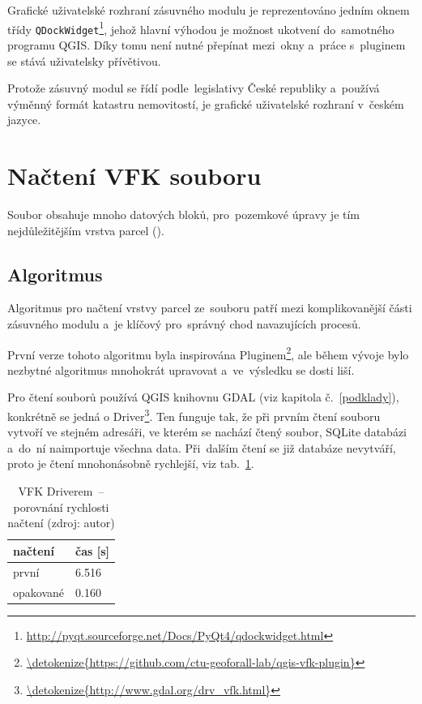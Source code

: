Grafické uživatelské rozhraní zásuvného modulu je reprezentováno
jedním oknem třídy
\texttt{QDockWidget}\footnote{\url{http://pyqt.sourceforge.net/Docs/PyQt4/qdockwidget.html}},
jehož hlavní výhodou je možnost ukotvení do~samotného programu
QGIS. Díky tomu není nutné přepínat mezi~okny a~práce s~pluginem se
stává uživatelsky přívětivou.

Protože zásuvný modul se řídí podle~legislativy České republiky
a~používá výmě\-nný formát katastru nemovitostí, je grafické
uživatelské rozhraní v~českém jazyce.

\section{Načtení VFK souboru}
\label{nacteni_vfk}

Soubor  obsahuje mnoho datových bloků, pro~pozemkové úpravy je
tím nej\-důležitějším vrstva parcel (\texttt{}).

\subsection{Algoritmus}
\label{nacteni_vfk_algoritmus}

Algoritmus pro načtení vrstvy parcel ze~souboru  patří mezi
komplikovanější části zásuvného modulu a~je klíčový pro~správný chod
navazujících procesů.

První verze tohoto algoritmu byla inspirována 
Pluginem\footnote{\url{\detokenize{https://github.com/ctu-geoforall-lab/qgis-vfk-plugin}}},
ale během vývoje bylo nezbytné algoritmus mnohokrát upravovat
a~ve~výsledku se dosti liší.

Pro čtení  souborů používá QGIS knihovnu GDAL (viz kapitola
č.~\ref{podklady}), konkrétně se jedná o 
Driver\footnote{\url{\detokenize{http://www.gdal.org/drv_vfk.html}}}. Ten
funguje tak, že při prvním čtení souboru vytvoří ve stejném adresáři,
ve kterém se nachází čtený  soubor, SQLite databázi a~do~ní
naimportuje všechna data. Při~dalším čtení se již databáze nevytváří,
proto je čtení mnohonásobně rychlejší, viz
tab.~\ref{tab:nacteni_vfk_driver}.

\begin{table}[H]
    \begin{tabular}{|l|l|} \hline načtení & čas [s] \\ \hline \hline
první & 6.516 \\ \hline opakované & 0.160 \\ \hline
    \end{tabular} \centering
    \caption[VFK Driverem~– porovnání rychlosti načtení]{VFK
Driverem~– porovnání rychlosti načtení (zdroj: autor)}
    \label{tab:nacteni_vfk_driver}
\end{table}

